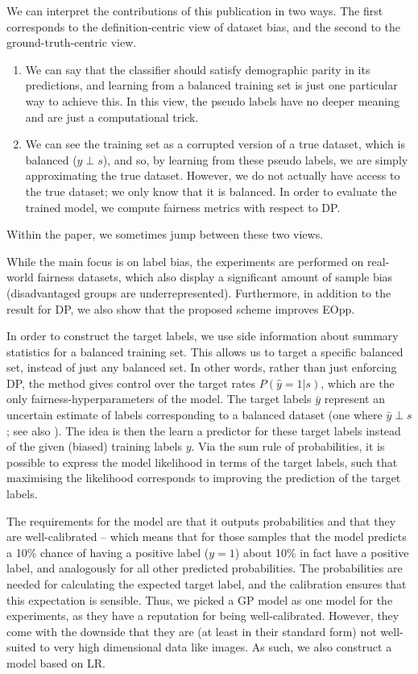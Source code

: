 We can interpret the contributions of this publication in two ways.
The first corresponds to the definition-centric view of dataset bias,
and the second to the ground-truth-centric view.
\begin{enumerate}
  \item
    We can say that the classifier should satisfy demographic parity in its predictions,
    and learning from a balanced training set is just one particular way to achieve this.
    In this view, the pseudo labels have no deeper meaning and are just a computational trick.
  \item
    We can see the training set as a corrupted version of a true dataset, which is balanced (\(y\perp s\)),
    and so, by learning from these pseudo labels, we are simply approximating the true dataset.
    However, we do not actually have access to the true dataset; we only know that it is balanced.
    In order to evaluate the trained model, we compute fairness metrics with respect to \ac{DP}.
\end{enumerate}
Within the paper, we sometimes jump between these two views.

While the main focus is on label bias,
the experiments are performed on real-world fairness datasets,
which also display a significant amount of sample bias (disadvantaged groups are underrepresented).
Furthermore, in addition to the result for \ac{DP}, we also show that the proposed scheme improves \acf{EOpp}.

In order to construct the target labels,
we use side information about summary statistics for a balanced training set.
This allows us to target a specific balanced set, instead of just any balanced set.
In other words, rather than just enforcing \ac{DP}, the method gives control over the target rates \(P(\hat{y}=1|s)\),
which are the only fairness-hyperparameters of the model.
The target labels \(\bar{y}\) represent an uncertain estimate of labels corresponding to a balanced dataset
(one where \(\bar{y} \perp s\); see also ).
The idea is then the learn a predictor for these target labels instead of the given (biased) training labels \(y\).
Via the sum rule of probabilities, it is possible to express the model likelihood in terms of the target labels,
such that maximising the likelihood corresponds to improving the prediction of the target labels.

The requirements for the model are that it outputs probabilities
and that they are well-calibrated --
which means that for those samples
that the model predicts a 10\% chance of having a positive label (\(y=1\))
about 10\% in fact have a positive label,
and analogously for all other predicted probabilities.
The probabilities are needed for calculating the expected target label,
and the calibration ensures that this expectation is sensible.
Thus, we picked a \acf{GP} model as one model for the experiments,
as they have a reputation for being well-calibrated.
However, they come with the downside that they are (at least in their standard form)
not well-suited to very high dimensional data like images.
As such, we also construct a model based on \acf{LR}.

